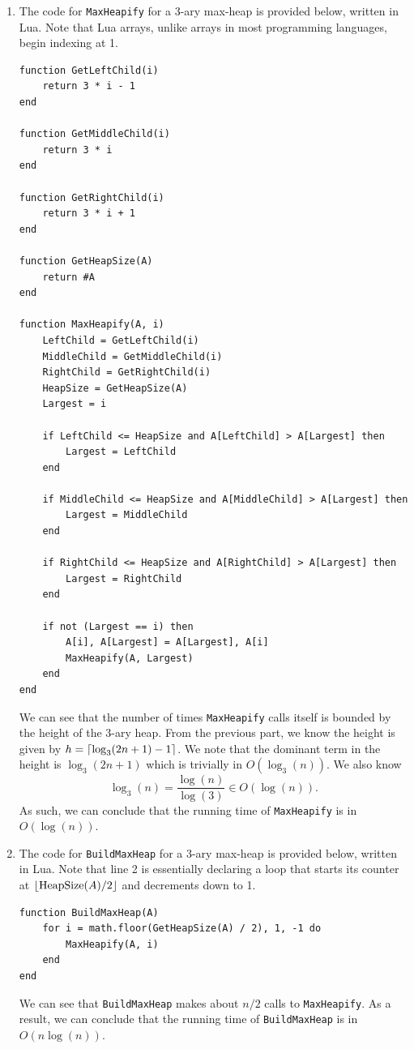\documentclass[11pt, letterpaper, titlepage]{article}
\DeclarePairedDelimiter\ceil{\lceil}{\rceil}
\DeclarePairedDelimiter\floor{\lfloor}{\rfloor}
\begin{document}
\begin{enumerate}[label=\alph*)]
    \item The code for \texttt{MaxHeapify} for a 3-ary max-heap is provided below, written in Lua. Note that Lua arrays, unlike arrays in most programming languages, begin indexing at 1.
    \begin{verbatim}
function GetLeftChild(i)
    return 3 * i - 1
end

function GetMiddleChild(i)
    return 3 * i
end

function GetRightChild(i)
    return 3 * i + 1
end

function GetHeapSize(A)
    return #A
end

function MaxHeapify(A, i)
    LeftChild = GetLeftChild(i)
    MiddleChild = GetMiddleChild(i)
    RightChild = GetRightChild(i)
    HeapSize = GetHeapSize(A)
    Largest = i
    
    if LeftChild <= HeapSize and A[LeftChild] > A[Largest] then
        Largest = LeftChild
    end
    
    if MiddleChild <= HeapSize and A[MiddleChild] > A[Largest] then
        Largest = MiddleChild
    end
    
    if RightChild <= HeapSize and A[RightChild] > A[Largest] then
        Largest = RightChild
    end
    
    if not (Largest == i) then
        A[i], A[Largest] = A[Largest], A[i]
        MaxHeapify(A, Largest)
    end
end
    \end{verbatim}
    We can see that the number of times \texttt{MaxHeapify} calls itself is bounded by the height of the 3-ary heap. From the previous part, we know the height is given by $h = \ceil*{\log_3(2n + 1) - 1}$. We note that the dominant term in the height is $\log_3(2n + 1)$ which is trivially in $O(\log_3(n))$. We also know 
    \begin{equation}
        \log_3(n) = \dfrac{\log(n)}{\log(3)} \in O(\log(n)).
    \end{equation}
    As such, we can conclude that the running time of \texttt{MaxHeapify} is in $O(\log(n))$. 

    \item The code for \texttt{BuildMaxHeap} for a 3-ary max-heap is provided below, written in Lua. Note that line 2 is essentially declaring a loop that starts its counter at $\floor*{\text{HeapSize}(A) / 2}$ and decrements down to 1.
    \begin{verbatim}
function BuildMaxHeap(A)
    for i = math.floor(GetHeapSize(A) / 2), 1, -1 do
        MaxHeapify(A, i)
    end
end
    \end{verbatim}
    We can see that \texttt{BuildMaxHeap} makes about $n/2$ calls to \texttt{MaxHeapify}. As a result, we can conclude that the running time of \texttt{BuildMaxHeap} is in $O(n\log(n))$.


\end{enumerate}
\end{document}
